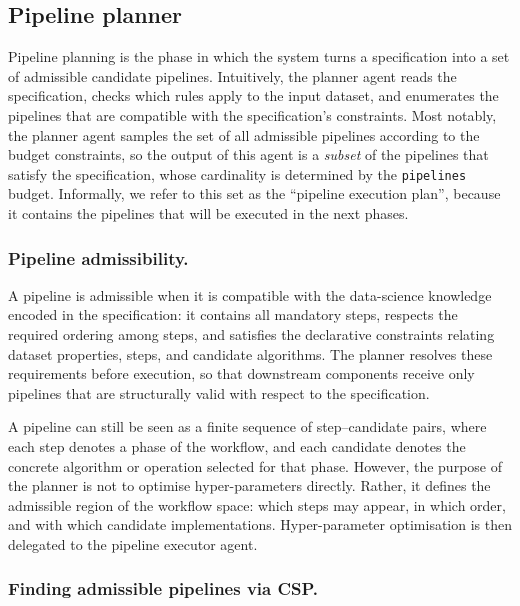 \documentclass[runningheads]{llncs}
\begin{document}
\subsection{Pipeline planner}
\label{subsec:pipeline-planning}

Pipeline planning is the phase in which the system turns a specification into a set of admissible candidate pipelines.
%
Intuitively,
the planner agent reads the specification,
checks which rules apply to the input dataset,
and enumerates the pipelines that are compatible with the specification's constraints.
%
Most notably,
the planner agent samples the set of all admissible pipelines according to the budget constraints,
so the output of this agent is a \emph{subset} of the pipelines that satisfy the specification,
whose cardinality is determined by the \texttt{pipelines} budget.
%
Informally,
we refer to this set as the ``pipeline execution plan'',
because it contains the pipelines that will be executed in the next phases.

\subsubsection{Pipeline admissibility.}
%
A pipeline is admissible when it is compatible with the data-science knowledge encoded in the specification:
it contains all mandatory steps,
respects the required ordering among steps,
and satisfies the declarative constraints relating dataset properties,
steps,
and candidate algorithms.
%
%
The planner resolves these requirements before execution,
so that downstream components receive only pipelines that are structurally valid with respect to the specification.

A pipeline can still be seen as a finite sequence of step--candidate pairs,
where each step denotes a phase of the workflow,
and each candidate denotes the concrete algorithm or operation selected for that phase.
%
However,
the purpose of the planner is not to optimise hyper-parameters directly.
%
Rather,
it defines the admissible region of the workflow space:
which steps may appear,
in which order,
and with which candidate implementations.
%
Hyper-parameter optimisation is then delegated to the pipeline executor agent.

\subsubsection{Finding admissible pipelines via \acs{CSP}.}
\end{document}

